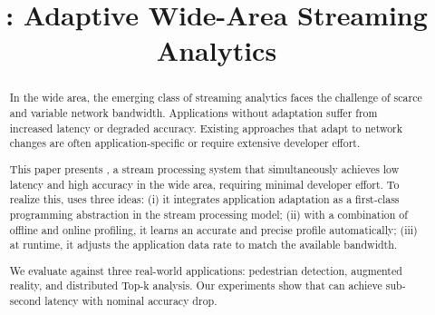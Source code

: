 \documentclass[sigplan,10pt,anonymous]{acmart}\settopmatter{printfolios=true}
\begin{document}


\title{\sysname{}: Adaptive Wide-Area Streaming Analytics}
\gdef\addresses{Paper \textbf{\#200}, 12 pages}

\begin{abstract}
  In the wide area, the emerging class of streaming analytics faces the
  challenge of scarce and variable network bandwidth. Applications without
  adaptation suffer from increased latency or degraded accuracy. Existing
  approaches that adapt to network changes are often application-specific or
  require extensive developer effort.

  This paper presents \sysname{}, a stream processing system that simultaneously
  achieves low latency and high accuracy in the wide area, requiring minimal
  developer effort. To realize this, \sysname{} uses three ideas: (i) it
  integrates application adaptation as a first-class programming abstraction in
  the stream processing model; (ii) with a combination of offline and online
  profiling, it learns an accurate and precise profile automatically; (iii) at
  runtime, it adjusts the application data rate to match the available
  bandwidth.

  We evaluate \sysname{} against three real-world applications: pedestrian
  detection, augmented reality, and distributed Top-k analysis. Our experiments
  show that \sysname{} can achieve sub-second latency with nominal accuracy
  drop.
\end{abstract}

\maketitle











\def \bibfont {\normalsize}

\end{document}
